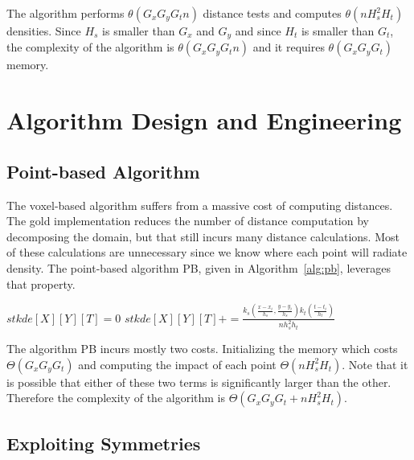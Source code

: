 \documentclass[10pt, conference, compsocconf]{IEEEtran}
\begin{document}
The algorithm performs $\theta(G_x G_y G_t n)$ distance tests and
computes $\theta(n H_s^2 H_t )$ densities. Since $H_s$ is smaller than
$G_x$ and $G_y$ and since $H_t$ is smaller than $G_t$, the complexity of the
algorithm is $\theta(G_x G_y G_t n )$ and it requires $\theta(G_x G_y G_t)$
memory.

\section{Algorithm Design and Engineering}

\label{sec:algo-seq}

\subsection{Point-based Algorithm}
The voxel-based algorithm suffers from a massive cost of computing
distances. The gold implementation reduces the number of distance computation by 
decomposing the domain, but that still incurs many distance calculations.
Most of these calculations are unnecessary since we know
where each point will radiate density. The point-based
algorithm PB, given in Algorithm~\ref{alg:pb}, leverages that
property.

\begin{algorithm}
\caption{\textsc{PB}}
\scriptsize
\begin{algorithmic}
  \State $stkde[X][Y][T] = 0$
\EndFor
%
        \State $stkde[X][Y][T] += \frac{k_s(\frac{x-x_i}{h_s},\frac{y-y_i}{h_s}) k_t(\frac{t-t_i}{h_t})}{n h_s^2h_t}$
        \EndIf
      \EndFor
    \EndFor
  \EndFor
\EndFor
\end{algorithmic}
\label{alg:pb}
\end{algorithm}

The algorithm PB incurs mostly two costs. Initializing the memory which costs
$\Theta(G_x G_y G_t)$ and computing the impact of each point
$\Theta(n H_s^2 H_t)$. Note that it is possible that either of these
two terms is significantly larger than the other. Therefore the
complexity of the algorithm is $\Theta(G_x G_y G_t + n H_s^2 H_t)$.

\subsection{Exploiting Symmetries}
\end{document}

